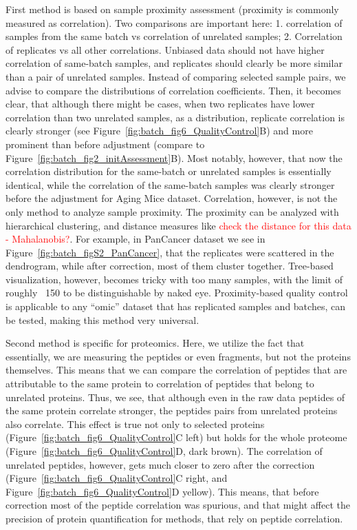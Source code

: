 \documentclass[num-refs]{wiley-article}
\begin{document}
First method is based on sample proximity assessment (proximity is commonly measured as correlation). Two comparisons are important here: 1. correlation of samples from the same batch vs correlation of unrelated samples; 2. Correlation of replicates vs all other correlations. Unbiased data should not have higher correlation of same-batch samples, and replicates should clearly be more similar than a pair of unrelated samples. Instead of comparing selected sample pairs, we advise to compare the distributions of correlation coefficients. Then, it becomes clear, that although there might be cases, when two replicates have lower correlation than two unrelated samples, as a distribution, replicate correlation is clearly stronger (see Figure~\ref{fig:batch_fig6_QualityControl}B) and more prominent than before adjustment (compare to Figure~\ref{fig:batch_fig2_initAssessment}B). Most notably, however, that now the correlation distribution for the same-batch or unrelated samples is essentially identical, while the correlation of the same-batch samples was clearly stronger before the adjustment for Aging Mice dataset. Correlation, however, is not the only method to analyze sample proximity. The proximity can be analyzed with hierarchical clustering, and distance measures like \textcolor{red}{check the distance for this data - Mahalanobis?}. For example, in PanCancer dataset we see in Figure~\ref{fig:batch_figS2_PanCancer}, that the replicates were scattered in the dendrogram, while after correction, most of them cluster together. Tree-based visualization, however, becomes tricky with too many samples, with the limit of roughly ~150 to be distinguishable by naked eye. Proximity-based quality control is applicable to any “omic” dataset that has replicated samples and batches, can be tested, making this method very universal. 

Second method is specific for proteomics. Here, we utilize the fact that essentially, we are measuring the peptides or even fragments, but not the proteins themselves. This means that we can compare the correlation of peptides that are attributable to the same protein to correlation of peptides that belong to unrelated proteins. Thus, we see, that although even in the raw data peptides of the same protein correlate stronger, the peptides pairs from unrelated proteins also correlate. This effect is true not only to selected proteins (Figure~\ref{fig:batch_fig6_QualityControl}C left) but holds for the whole proteome (Figure~\ref{fig:batch_fig6_QualityControl}D, dark brown). The correlation of unrelated peptides, however, gets much closer to zero after the correction (Figure~\ref{fig:batch_fig6_QualityControl}C right, and Figure~\ref{fig:batch_fig6_QualityControl}D yellow). This means, that before correction most of the peptide correlation was spurious, and that might affect the precision of protein quantification for methods, that rely on peptide correlation.
\end{document}

